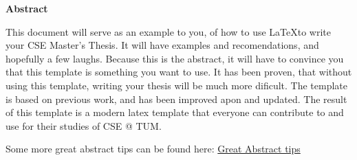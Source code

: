 \clearemptydoublepage
{}
{}

\vspace*{2cm}
\begin{center}
{\Large \textbf{Abstract}}
\end{center}
\vspace{1cm}

This document will serve as an example to you, of how to use \LaTeX to write your
CSE Master's Thesis. It will have examples and recomendations, and hopefully a
few laughs.  Because this is the abstract, it will have to convince you that this 
template is something you want to use.  It has been proven, that without using
this template, writing your thesis will be much more dificult. The template is
based on previous work, and has been improved apon and updated.  The result of 
this template is a modern latex template that everyone can contribute to and use
for their studies of CSE @ TUM.

Some more great abstract tips can be found here: 
\href{https://users.ece.cmu.edu/~koopman/essays/abstract.html}{Great Abstract tips}
